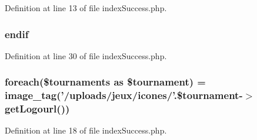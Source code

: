 Definition at line 13 of file index\-Success.\-php.

\hypertarget{backend_2modules_2tournament__slot_2templates_2index_success_8php_a82cd33ca97ff99f2fcc5e9c81d65251b}{
\subsubsection[{endif}]{\setlength{\rightskip}{0pt plus 5cm}endif}}\label{backend_2modules_2tournament__slot_2templates_2index_success_8php_a82cd33ca97ff99f2fcc5e9c81d65251b}


Definition at line 30 of file index\-Success.\-php.

\hypertarget{backend_2modules_2tournament__slot_2templates_2index_success_8php_af5a9b5f31e18b62a7ff910ce8e4702ac}{
\subsubsection[{foreach}]{\setlength{\rightskip}{0pt plus 5cm}foreach(\$tournaments as \$tournament) = image\-\_\-tag('/uploads/jeux/icones/'.\$tournament-\/$>${\bf get\-Logourl}())}}\label{backend_2modules_2tournament__slot_2templates_2index_success_8php_af5a9b5f31e18b62a7ff910ce8e4702ac}


Definition at line 18 of file index\-Success.\-php.

